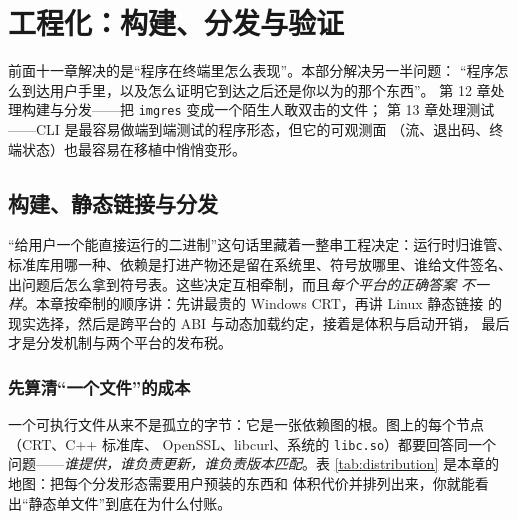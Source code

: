 \documentclass[12pt,a4paper,fontset=fandol]{ctexbook}
\newcommand{\Tp}[1]{\texttt{#1}}
\begin{document}
\part{工程化：构建、分发与验证}

前面十一章解决的是``程序在终端里怎么表现''。本部分解决另一半问题：
``程序怎么到达用户手里，以及怎么证明它到达之后还是你以为的那个东西''。
第 12 章处理构建与分发——把 \Tp{imgres} 变成一个陌生人敢双击的文件；
第 13 章处理测试——CLI 是最容易做端到端测试的程序形态，但它的可观测面
（流、退出码、终端状态）也最容易在移植中悄悄变形。

\chapter{构建、静态链接与分发}

``给用户一个能直接运行的二进制''这句话里藏着一整串工程决定：运行时归谁管、
标准库用哪一种、依赖是打进产物还是留在系统里、符号放哪里、谁给文件签名、
出问题后怎么拿到符号表。这些决定互相牵制，而且\emph{每个平台的正确答案
不一样}。本章按牵制的顺序讲：先讲最贵的 Windows CRT，再讲 Linux 静态链接
的现实选择，然后是跨平台的 ABI 与动态加载约定，接着是体积与启动开销，
最后才是分发机制与两个平台的发布税。

\section{先算清``一个文件''的成本}

一个可执行文件从来不是孤立的字节：它是一张依赖图的根。图上的每个节点
（CRT、C++ 标准库、 OpenSSL、libcurl、系统的 \Tp{libc.so}）都要回答同一个
问题——\emph{谁提供，谁负责更新，谁负责版本匹配}。表
\ref{tab:distribution} 是本章的地图：把每个分发形态需要用户预装的东西和
体积代价并排列出来，你就能看出``静态单文件''到底在为什么付账。
\end{document}

